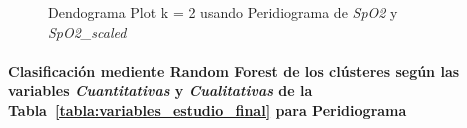 \begin{figure}[ht]
    \centering
    \hfill
    \caption{Dendograma Plot k = 2 usando Peridiograma de \textit{SpO2} y \textit{SpO2\_scaled}}\label{fig:per_ctg_spo2}
\end{figure}

\paragraph{Clasificación mediente Random Forest de los clústeres según las variables \textit{Cuantitativas} y \textit{Cualitativas} de la Tabla~\ref{tabla:variables_estudio_final} para Peridiograma}

